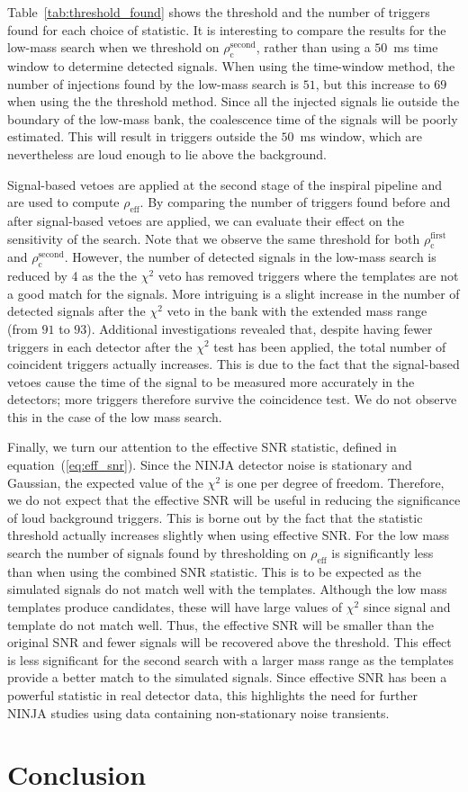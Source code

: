Table~\ref{tab:threshold_found} shows the threshold and the number of triggers
found for each choice of statistic. It is interesting to compare the results
for the low-mass search when we threshold on
$\rho_\mathrm{c}^\mathrm{second}$, rather than using a $50$~ms time window to
determine detected signals. When using the time-window method, the number of
injections found by the low-mass search is $51$, but this increase to $69$
when using the the threshold method. Since all the injected signals lie
outside the boundary of the low-mass bank, the coalescence time of the signals
will be poorly estimated. This will result in triggers outside the $50$~ms
window, which are nevertheless are loud enough to lie above the background.

Signal-based vetoes are applied at the second stage of the inspiral
pipeline and are used to compute $\rho_\mathrm{eff}$. By comparing the
number of triggers found before and after signal-based vetoes are
applied, we can evaluate their effect on the sensitivity of the
search. Note that we observe the same threshold for both
$\rho_\mathrm{c}^\mathrm{first}$ and
$\rho_\mathrm{c}^\mathrm{second}$. However, the number of detected
signals in the low-mass search is reduced by 4 as the the $\chi^2$
veto has removed triggers where the templates are not a good match for
the signals.  More intriguing is a slight increase in the number of
detected signals after the $\chi^2$ veto in the bank with the extended
mass range (from $91$ to $93$).  Additional investigations revealed
that, despite having fewer triggers in each detector after the
$\chi^2$ test has been applied, the total number of coincident
triggers actually increases. This is due to the fact that the
signal-based vetoes cause the time of the signal to be measured more
accurately in the detectors; more triggers therefore survive the
coincidence test.  We do not observe this in the case of the low mass
search.  

Finally, we turn our attention to the effective SNR statistic, defined
in equation~(\ref{eq:eff_snr}).  Since the NINJA detector noise is
stationary and Gaussian, the expected value of the $\chi^{2}$ is one
per degree of freedom.  Therefore, we do not expect that the effective
SNR will be useful in reducing the significance of loud background
triggers.  This is borne out by the fact that the statistic threshold
actually increases slightly when using effective SNR.  For the low
mass search the number of signals found by thresholding on
$\rho_\mathrm{eff}$ is significantly less than when using the combined
SNR statistic.  This is to be expected as the simulated signals do not
match well with the templates.  Although the low mass templates
produce candidates, these will have large values of $\chi^{2}$ since
signal and template do not match well.  Thus, the effective SNR will
be smaller than the original SNR and fewer signals will be recovered
above the threshold.  This effect is less significant for the second
search with a larger mass range as the templates provide a better
match to the simulated signals. Since effective SNR has been a
powerful statistic in real detector data, this highlights the need for
further NINJA studies using data containing non-stationary noise
transients.


\section{Conclusion}
%







